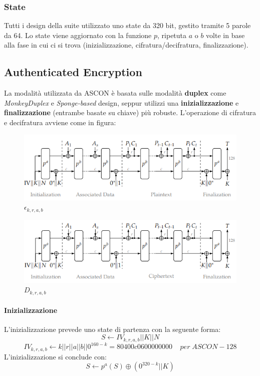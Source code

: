 \subsubsection{State}
Tutti i design della suite utilizzato uno state da 320 bit, gestito tramite 5 parole da 64. Lo state viene aggiornato con la funzione $p$, ripetuta $a$ o $b$ volte in base alla fase in cui ci si trova (inizializzazione, cifratura/decifratura, finalizzazione). 

\subsection{Authenticated Encryption}
La modalità utilizzata da ASCON è basata sulle modalità \textbf{duplex} come \textsl{MonkeyDuplex} e \textsl{Sponge-based} design, seppur utilizzi una \textbf{inizializzazione} e \textbf{finalizzazione} (entrambe basate su chiave) più robuste. L'operazione di cifratura e decifratura avviene come in figura: 
\begin{figure}[h!]
    \centering
    \includegraphics[width=12cm]{images/enc.png}
    \caption[short]{$\epsilon_{k,r,a,b}$}
\end{figure}
\begin{figure}[h!]
    \centering
    \includegraphics[width=12cm]{images/dec.png}
    \caption[short]{$D_{k,r,a,b}$}
\end{figure}
\paragraph*{Inizializzazione}
L'inizializzazione prevede uno state di partenza con la seguente forma: 
\[S \leftarrow IV_{k,r,a,b} || K || N\]
\[IV_{k,r,a,b} \leftarrow k || r || a || b || 0^{160-k} = 80400c0600000000\;\;\;\;per\;ASCON-128\]
L'inizializzazione si conclude con:
\[S\leftarrow p^a(S)\oplus (0^{320-k} || K)\]

